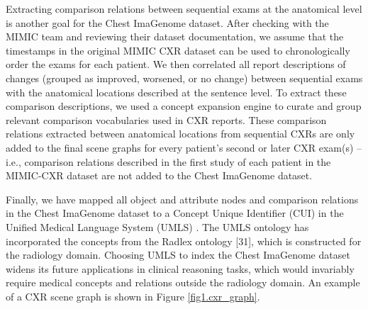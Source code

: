 Extracting comparison relations between sequential exams at the anatomical level is another goal for the Chest ImaGenome dataset. After checking with the MIMIC team and reviewing their dataset documentation, we assume that the timestamps in the original MIMIC CXR dataset can be used to chronologically order the exams for each patient. We then correlated all report descriptions of changes (grouped as improved, worsened, or no change) between sequential exams with the anatomical locations described at the sentence level. To extract these comparison descriptions, we used a concept expansion engine \cite{coden2012spot} to curate and group relevant comparison vocabularies used in CXR reports. These comparison relations extracted between anatomical locations from sequential CXRs are only added to the final scene graphs for every patient's second or later CXR exam(s) -- i.e., comparison relations described in the first study of each patient in the MIMIC-CXR dataset are not added to the Chest ImaGenome dataset.

Finally, we have mapped all object and attribute nodes and comparison relations in the Chest ImaGenome dataset to a Concept Unique Identifier (CUI) in the Unified Medical Language System (UMLS) \cite{bodenreider2004unified}. The UMLS ontology has incorporated the concepts from the Radlex ontology [31], which is constructed for the radiology domain. Choosing UMLS to index the Chest ImaGenome dataset widens its future applications in clinical reasoning tasks, which would invariably require medical concepts and relations outside the radiology domain. An example of a CXR scene graph is shown in Figure \ref{fig1.cxr_graph}.








